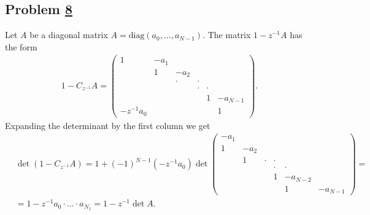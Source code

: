 \documentclass[12pt]{article}
\numberwithin{equation}{section}
\theoremstyle{definition}
\newcommand{\myhref}[2]{\hyperref[#1]{#2}}%
\begin{document}
\subsection{Problem \myhref{prob8}{8}}
Let $A$ be a diagonal matrix $A = \mathrm{diag}(a_{0}, ..., a_{N-1})$.  The matrix $1 - z^{-1} A$ has the form
\begin{align}\label{1-za}
    1 - C_{z^{-1}} A =  \begin{pmatrix}
        1 & -a_{1}\\
          & 1 & -a_{2}\\
          &   & \cdot & \cdot\\
          &   &  & \cdot & \cdot\\
          &   &  &  & 1 & -a_{N-1}\\
         -z^{-1}a_{0} &  &  &  &      & 1  
    \end{pmatrix}.
\end{align}
Expanding the determinant by the first column we get
\begin{align*}
    &\det (1 - C_{z^{-1}} A) = 1 + (-1)^{N-1}(-z^{-1}a_{0})\det
    \begin{pmatrix}
        -a_{1} & \\
         1 & -a_{2} & \\
          &  1 & \cdot & \cdot\\
          &   &  & \cdot & \cdot\\
          &   &  &  1 & -a_{N-2} & \\
          &  &  &  &   1   & -a_{N-1}  
    \end{pmatrix}=\\
    &=1 - z^{-1}a_{0}\cdot ... \cdot a_{N_1} = 1 - z^{-1}\det A.
\end{align*}
\end{document}

